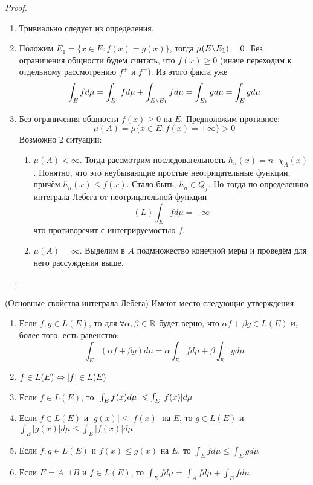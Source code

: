 \begin{proof}~
	\begin{enumerate}
		\item Тривиально следует из определения.
		
		\item Положим $E_1 = \{x \in E \colon f(x) = g(x)\}$, тогда $\mu(E \backslash E_1) = 0$. Без ограничения общности будем считать, что $f(x) \ge 0$ (иначе переходим к отдельному рассмотрению $f^+$ и $f^-$). Из этого факта уже
		\[
			\int_E fd\mu = \int_{E_1} fd\mu + \int_{E \backslash E_1} fd\mu = \int_{E_1} gd\mu = \int_E gd\mu
		\]
		
		\item Без ограничения общности $f(x) \ge 0$ на $E$. Предположим противное:
		\[
			\mu(A) = \mu\{x \in E \colon f(x) = +\infty\} > 0
		\]
		Возможно 2 ситуации:
		\begin{enumerate}
			\item $\mu(A) < \infty$. Тогда рассмотрим последовательность $h_n(x) = n \cdot \chi_A(x)$. Понятно, что это неубывающие простые неотрицательные функции, причём $h_n(x) \le f(x)$. Стало быть, $h_n \in Q_f$. Но тогда по определению интеграла Лебега от неотрицательной функции
			\[
				(L)\int_E fd\mu = +\infty
			\]
			что противоречит с интегрируемостью $f$.
			
			\item $\mu(A) = \infty$. Выделим в $A$ подмножество конечной меры и проведём для него рассуждения выше.
		\end{enumerate}
	\end{enumerate}
\end{proof}

\begin{theorem} (Основные свойства интеграла Лебега)
	Имеют место следующие утверждения:
	\begin{enumerate}
		\item Если $f, g \in L(E)$, то для $\forall \alpha, \beta \in \mathbb{R}$ будет верно, что $\alpha f + \beta g \in L(E)$ и, более того, есть равенство:
		\[
			\int_E (\alpha f + \beta g)d\mu = \alpha \int_E fd\mu + \beta \int_E gd\mu
		\]
		
		\item $f \in L(E) \Leftrightarrow |f| \in L(E)$
		
		\item Если $f \in L(E)$, то \(\left|\int_E f(x)d\mu\right| \leqslant \int_E |f(x)|d\mu\)
		
		\item Если $f \in L(E)$ и $|g(x)| \le |f(x)|$ на $E$, то $g \in L(E)$ и \(\int_E |g(x)|d\mu \le \int_E |f(x)|d\mu\)
		
		\item Если $f, g \in L(E)$ и $f(x) \le g(x)$ на $E$, то \(\int_E fd\mu \le \int_E gd\mu\)
		
		\item Если $E = A \sqcup B$ и $f \in L(E)$, то $\int_E fd\mu = \int_A fd\mu + \int_B fd\mu$
	\end{enumerate}
\end{theorem}

